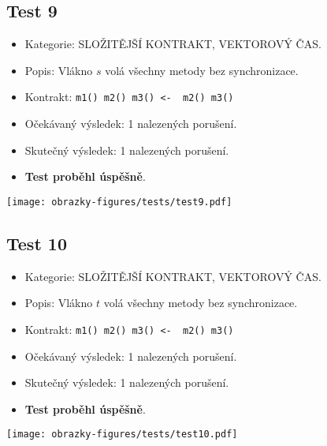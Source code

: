 \subsection*{Test 9}
\begin{itemize}
\item Kategorie: SLOŽITĚJŠÍ KONTRAKT, VEKTOROVÝ ČAS.
\item Popis: Vlákno $s$ volá všechny metody bez synchronizace.
\item Kontrakt: \texttt{m1() m2() m3() <- { m2() m3() }}
\item Očekávaný výsledek: 1 nalezených porušení.
\item Skutečný výsledek: 1 nalezených porušení.

\item \textbf{Test proběhl úspěšně}.
\end{itemize}
\begin{center}
    \centering
    \texttt{[image: obrazky-figures/tests/test9.pdf]}
    \label{test9}
\end{center}

\subsection*{Test 10}
\begin{itemize}
\item Kategorie: SLOŽITĚJŠÍ KONTRAKT, VEKTOROVÝ ČAS.
\item Popis: Vlákno $t$ volá všechny metody bez synchronizace.
\item Kontrakt: \texttt{m1() m2() m3() <- { m2() m3() }}
\item Očekávaný výsledek: 1 nalezených porušení.
\item Skutečný výsledek: 1 nalezených porušení.

\item \textbf{Test proběhl úspěšně}.
\end{itemize}
\begin{center}
    \centering
    \texttt{[image: obrazky-figures/tests/test10.pdf]}
    \label{test10}
\end{center}

